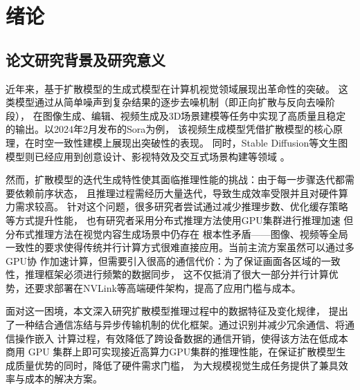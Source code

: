 \newpage

\section{绪论}
\subsection{论文研究背景及研究意义}
\fangsong
\par
近年来，基于扩散模型的生成式模型在计算机视觉领域展现出革命性的突破。
这类模型通过从简单噪声到复杂结果的逐步去噪机制（即正向扩散与反向去噪阶段），
在图像生成、编辑、视频生成及3D场景建模等任务中实现了高质量且稳定的输出\cite{ho2020denoising}。以2024年2月发布的Sora为例，
该视频生成模型凭借扩散模型的核心原理，在时空一致性建模上展现出突破性的表现\cite{brooks2024video}。
同时，Stable Diffusion等文生图模型则已经应用到创意设计、影视特效及交互式场景构建等领域
\cite{lyu2019advances,dhariwal2021diffusion,rombach2022high}。
\par
然而，扩散模型的迭代生成特性使其面临推理性能的挑战：由于每一步骤迭代都需要依赖前序状态，
且推理过程需经历大量迭代，导致生成效率受限并且对硬件算力需求较高\cite{Li2023SnapFusionTD}。
针对这个问题，很多研究者尝试通过减少推理步数、优化缓存策略等方式提升性能\cite{song2020denoising, liu2024difffno,Ma2023DeepCacheAD, salimans2022progressive}，
也有研究者采用分布式推理方法使用GPU集群进行推理加速\cite{chen2024asyncdiff, li2024distrifusion}
但分布式推理方法在视觉内容生成场景中仍存在
根本性矛盾——图像、视频等全局一致性的要求使得传统并行计算方式很难直接应用。当前主流方案虽然可以通过多GPU协
作加速计算，但需要引入很高的通信代价：为了保证画面各区域的一致性，推理框架必须进行频繁的数据同步，
这不仅抵消了很大一部分并行计算优势，还要求部署在NVLink等高端硬件架构，提高了应用门槛与成本\cite{li2024distrifusion}。
\par
面对这一困境，本文深入研究扩散模型推理过程中的数据特征及变化规律，
提出了一种结合通信冻结与异步传输机制的优化框架。通过识别并减少冗余通信、将通信操作嵌入
计算过程，有效降低了跨设备数据的通信开销，使得该方法在低成本商用 GPU
集群上即可实现接近高算力GPU集群的推理性能，在保证扩散模型生成质量优势的同时，降低了硬件需求门槛，
为大规模视觉生成任务提供了兼具效率与成本的解决方案。
